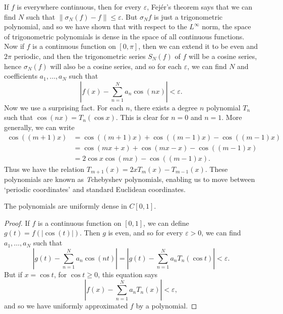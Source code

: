 If $f$ is everywhere continuous, then for every $\varepsilon$, Fej\'{e}r's theorem says that we can find $N$ such that $\| \sigma_N(f) - f \| \leq \varepsilon$. But $\sigma_N f$ is just a trigonometric polynomial, and so we have shown that with respect to the $L^\infty$ norm, the space of trigonometric polynomials is dense in the space of all continuous functions.  Now if $f$ is a continuous function on $[0,\pi]$, then we can extend it to be even and $2\pi$ periodic, and then the trigonometric series $S_N(f)$ of $f$ will be a cosine series, hence $\sigma_N(f)$ will also be a cosine series, and so for each $\varepsilon$, we can find $N$ and coefficients $a_1, \dots, a_N$ such that
%
\[ \left| f(x) - \sum_{n = 1}^N a_n \cos(nx) \right| < \varepsilon. \]
%
Now we use a surprising fact. For each $n$, there exists a degree $n$ polynomial $T_n$ such that $\cos(nx) = T_n(\cos x)$. This is clear for $n = 0$ and $n = 1$. More generally, we can write
%
\begin{align*}
    \cos((m+1)x) &= \cos((m+1)x) + \cos((m-1)x) - \cos((m-1)x)\\
    &= \cos(mx + x) + \cos(mx - x) - \cos((m-1)x)\\
    &= 2 \cos x \cos(mx) - \cos((m-1)x).
\end{align*}
%
Thus we have the relation  $T_{m+1}(x) = 2xT_m(x) - T_{m-1}(x)$. These polynomials are known as {\emph Tchebyshev polynomials}, enabling us to move between `periodic coordinates' and standard Euclidean coordinates.

\begin{corollary}[Weirstrass]
    The polynomials are uniformly dense in $C[0,1]$.
\end{corollary}
\begin{proof}
    If $f$ is a continuous function on $[0,1]$, we can define $g(t) = f(|\cos(t)|)$. Then $g$ is even, and so for every $\varepsilon > 0$, we can find $a_1, \dots, a_N$ such that
    \[ \left|g(t) - \sum_{n = 1}^N a_n \cos(nt) \right| = \left| g(t) - \sum_{n = 1}^N a_n T_n(\cos t) \right| < \varepsilon. \]
    But if $x = \cos t$, for $\cos t \geq 0$, this equation says
    \[ \left| f(x) - \sum_{n = 1}^N a_n T_n(x) \right| < \varepsilon, \]
    and so we have uniformly approximated $f$ by a polynomial.
\end{proof}

